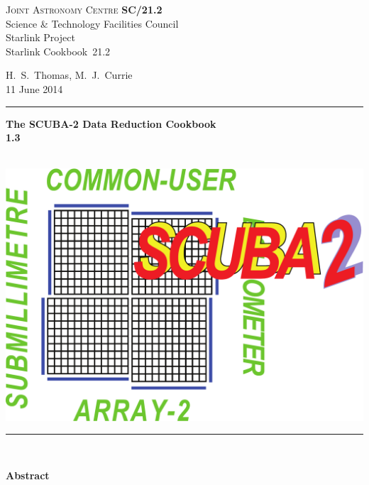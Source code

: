\documentclass[twoside,11pt]{article}
\newcommand{\stardoccategory}  {Starlink Cookbook}
\newcommand{\stardocinitials}  {SC}
\newcommand{\stardocnumber}    {21.2}
\newcommand{\stardocauthors}   {H.\ S.\ Thomas, M.\ J.\ Currie}
\newcommand{\stardocdate}      {11 June 2014}
\newcommand{\stardoctitle}     {The SCUBA-2 Data Reduction Cookbook}
\newcommand{\stardocversion}   {1.3}
\newcommand{\stardocmanual}    {\ }
\newcommand{\stardocname}{\stardocinitials /\stardocnumber}
\newenvironment{latexonly}{}{}
\renewcommand{\_}{\texttt{\symbol{95}}}
\begin{document}
\thispagestyle{empty}

\begin{latexonly}
   \textsc{Joint Astronomy Centre} \hfill \textbf{\stardocname}\\
   {\large Science \& Technology Facilities Council}\\
   {\large Starlink Project\\}
   {\large \stardoccategory\ \stardocnumber}
   \begin{flushright}
   \stardocauthors\\
   \stardocdate
   \end{flushright}
   \vspace{-4mm}
   \rule{\textwidth}{0.5mm}
   \vspace{5mm}
   \begin{center}
   {\Huge\textbf{\stardoctitle \\ [2.5ex]}}
   {\LARGE\textbf{\stardocversion \\ [4ex]}}
   {\Huge\textbf{\stardocmanual}}
   \end{center}
   \vspace{5mm}

   \begin{center}
   \includegraphics[scale=0.4]{sc21_s2logo}
   \end{center}
   \vspace{5mm}
   \rule{\textwidth}{0.5mm}\\
   \vspace{15mm}

   \vspace{10mm}
   \begin{center}
      {\Large\textbf{Abstract}}
   \end{center}

\end{latexonly}
\end{document}
